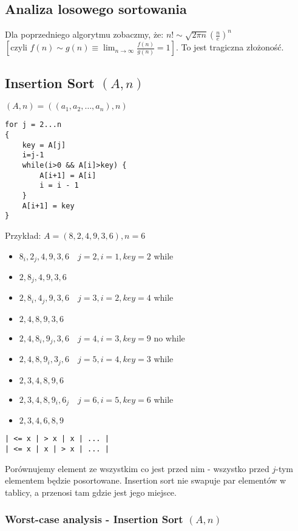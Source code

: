 \documentclass{article}
\begin{document}
\subsection{Analiza losowego sortowania}

Dla poprzedniego algorytmu zobaczmy, że: $n! \sim \sqrt{2\pi n} \left(\frac{n}{e}\right)^n$ $\left[\text{czyli } f(n)\sim g(n) \equiv \lim_{n\rightarrow \infty} \frac{f(n)}{g(n)} = 1 \right]$. To jest tragiczna złożoność.

\subsection{Insertion Sort $(A,n)$}

$(A,n) = ((a_1,a_2,\dots, a_n),n)$

\begin{verbatim}
for j = 2...n
{
    key = A[j]
    i=j-1
    while(i>0 && A[i]>key) {
        A[i+1] = A[i]
        i = i - 1
    }
    A[i+1] = key
}
\end{verbatim}

\noindent
Przykład: $A=(8, 2, 4, 9, 3, 6), n = 6$

\begin{itemize}
    \item $8_i, 2_j, 4, 9, 3, 6 \quad j=2, i=1, key = 2$ while
    \item $2, 8_j, 4, 9, 3, 6$
    \item $2, 8_i, 4_j, 9, 3, 6 \quad j=3, i=2, key = 4$ while
    \item $2, 4, 8, 9, 3, 6$
    \item $2, 4, 8_i, 9_j, 3, 6 \quad j=4, i=3, key = 9$ no while
    \item $2, 4, 8, 9_i, 3_j, 6 \quad j=5, i=4, key = 3$ while
    \item $2, 3, 4, 8, 9, 6$
    \item $2, 3, 4, 8, 9_i ,6_j \quad j=6, i=5, key = 6$ while
    \item $2, 3, 4, 6, 8, 9$
\end{itemize}

\begin{verbatim}
| <= x | > x | x | ... |
| <= x | x | > x | ... |
\end{verbatim}

\noindent
Porównujemy element ze wszystkim co jest przed nim - wszystko przed $j$-tym elementem będzie posortowane. Insertion sort nie swapuje par elementów w tablicy, a przenosi tam gdzie jest jego miejsce.

\subsubsection{Worst-case analysis - Insertion Sort $(A,n)$}
\end{document}
